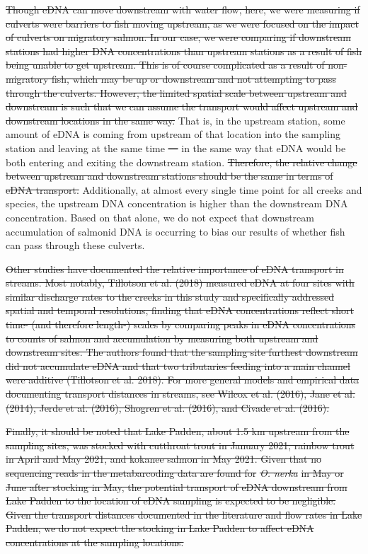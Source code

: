 \documentclass[
]{article}
\providecommand{\DIFaddtex}[1]{{\protect\color{blue}\uwave{#1}}} %
\providecommand{\DIFdeltex}[1]{{\protect\color{red}\sout{#1}}}                      %
\providecommand{\DIFaddbegin}{} %
\providecommand{\DIFaddend}{} %
\providecommand{\DIFdelbegin}{} %
\providecommand{\DIFdelend}{} %
\providecommand{\DIFadd}[1]{\texorpdfstring{\DIFaddtex{#1}}{#1}} %
\providecommand{\DIFdel}[1]{\texorpdfstring{\DIFdeltex{#1}}{}} %
\newcommand{\DIFscaledelfig}{0.5}
\newlength{\DIFdelgraphicswidth} %
\newlength{\DIFdelgraphicsheight} %
\newcommand{\DIFaddincludegraphics}[2][]{{\color{blue}\fbox{\DIFOincludegraphics[#1]{#2}}}} %
\newcommand{\DIFdelincludegraphics}[2][]{%
\sbox{\DIFdelgraphicsbox}{\DIFOincludegraphics[#1]{#2}}%
\settoboxwidth{\DIFdelgraphicswidth}{\DIFdelgraphicsbox} %
\settoboxtotalheight{\DIFdelgraphicsheight}{\DIFdelgraphicsbox} %
\scalebox{\DIFscaledelfig}{%
\parbox[b]{\DIFdelgraphicswidth}{\usebox{\DIFdelgraphicsbox}\\[-\baselineskip] \rule{\DIFdelgraphicswidth}{0em}}\llap{\resizebox{\DIFdelgraphicswidth}{\DIFdelgraphicsheight}{%
\setlength{\unitlength}{\DIFdelgraphicswidth}%
\begin{picture}(1,1)%
\thicklines\linethickness{2pt} %
{\color[rgb]{1,0,0}\put(0,0){\framebox(1,1){}}}%
{\color[rgb]{1,0,0}\put(0,0){\line( 1,1){1}}}%
{\color[rgb]{1,0,0}\put(0,1){\line(1,-1){1}}}%
\end{picture}%
}\hspace*{3pt}}} %
} %
\DeclareRobustCommand{\DIFaddbegin}{\DIFOaddbegin \let\includegraphics\DIFaddincludegraphics} %
\DeclareRobustCommand{\DIFaddend}{\DIFOaddend \let\includegraphics\DIFOincludegraphics} %
\DeclareRobustCommand{\DIFdelbegin}{\DIFOdelbegin \let\includegraphics\DIFdelincludegraphics} %
\DeclareRobustCommand{\DIFdelend}{\DIFOaddend \let\includegraphics\DIFOincludegraphics} %
\begin{document}
\DIFdel{Though eDNA can move downstream with water flow, here, we were measuring
if culverts were barriers to fish moving upstream, as we were focused on
the impact of culverts on migratory salmon. In our case, we were
comparing if downstream stations had higher DNA concentrations than
upstream stations as a result of fish being unable to get upstream. This
is of course complicated as a result of non-migratory fish, which may be
up or downstream and not attempting to pass through the culverts.
However, the limited spatial scale between upstream and downstream is
such that we can assume the transport would affect upstream and
downstream locations in the same way. }\DIFdelend That is, in the upstream station,
some amount of eDNA is coming from upstream of that location into the
sampling station and leaving at the same time \DIFdelbegin \DIFdel{--- }\DIFdelend \DIFaddbegin \DIFadd{-- }\DIFaddend in the same way that
eDNA would be both entering and exiting the downstream station.
\DIFdelbegin \DIFdel{Therefore, the relative change between upstream and downstream stations
should be the same in terms of eDNA transport. }\DIFdelend Additionally, at almost every single time point for all creeks and
species, the upstream DNA concentration is higher than the downstream
DNA concentration. Based on that alone, we do not expect that downstream
accumulation of salmonid DNA is occurring to bias our results of whether
fish can pass through these culverts.

\DIFdelbegin \DIFdel{Other studies have documented the relative importance of eDNA transport
in streams. Most notably, Tillotson et al. (2018) measured eDNA at four
sites with similar discharge rates to the creeks in this study and
specifically addressed spatial and temporal resolutions, finding that
eDNA concentrations reflect short time- (and therefore length-) scales
by comparing peaks in eDNA concentrations to counts of salmon and
accumulation by measuring both upstream and downstream sites. The
authors found that the sampling site furthest downstream did not
accumulate eDNA and that two tributaries feeding into a main channel
were additive (Tillotson et al. 2018). For more general models and
empirical data documenting transport distances in streams, see Wilcox et
al. (2016), Jane et al. (2014), Jerde et al. (2016), Shogren et al.
(2016), and Civade et al. (2016).
}%

\DIFdel{Finally, it should be noted that Lake Padden, about 1.5 km upstream from
the sampling sites, was stocked with cutthroat trout in January 2021,
rainbow trout in April and May 2021, and kokanee salmon in May 2021.
Given that no sequencing reads in the metabarcoding data are found for
}\emph{\DIFdel{O. nerka}} %
\DIFdel{in May or June after stocking in May, the potential
transport of eDNA downstream from Lake Padden to the location of eDNA
sampling is expected to be negligible. Given the transport distances
documented in the literature and flow rates in Lake Padden, we do not
expect the stocking in Lake Padden to affect eDNA concentrations at the
sampling locations.
}%
\end{document}
